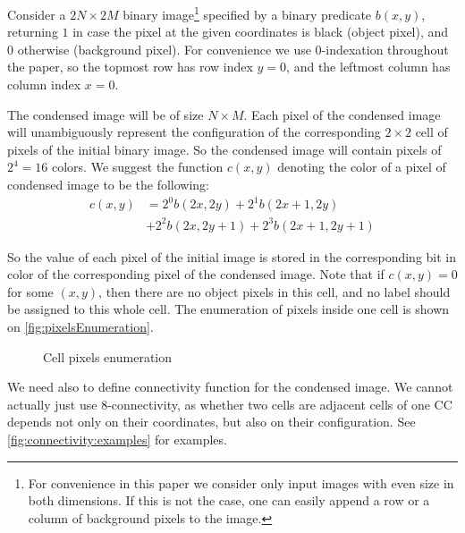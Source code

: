 \documentclass{llncs}
\begin{document}
Consider a $2N \times 2M$ binary image\footnote{
For convenience in this paper we consider only input images with even size
in both dimensions. If this is not the case, one can easily append a row or
a column of background pixels to the image.}
specified by a binary predicate $b(x, y)$,
returning $1$ in case the pixel at the given coordinates is black (object pixel),
and $0$ otherwise (background pixel).
For convenience we use 0-indexation throughout the paper, so the topmost row has
row index $y=0$, and the leftmost column has column index $x=0$.

The condensed image will be of size $N \times M$.
Each pixel of the condensed image will unambiguously represent the configuration
of the corresponding $2\times 2$ cell of pixels of the initial binary image.
So the condensed image will contain pixels of $2^4 = 16$ colors.
We suggest the function $c(x, y)$ denoting the color of a pixel of condensed image
to be the following:
\begin{align*}
  c(x, y) &= 2^0 b(2x, 2y)   + 2^1 b(2x+1, 2y) \\
          &+ {} 2^2 b(2x, 2y+1) + 2^3 b(2x+1,2y+1)
\end{align*}

So the value of each pixel of the initial image is stored in the corresponding
bit in color of the corresponding pixel of the condensed image.
Note that if $c(x, y) = 0$ for some $(x, y)$, then there are no object pixels in
this cell, and no label should be assigned to this whole cell. The enumeration of
pixels inside one cell is shown on \autoref{fig:pixelsEnumeration}.

\begin{figure}[t]
  \centering
  \caption{Cell pixels enumeration}
  \label{fig:pixelsEnumeration}
\end{figure}

We need also to define connectivity function for the condensed image.
We cannot actually just use 8-connectivity, as whether two cells are adjacent
cells of one CC depends not only on their coordinates, but also on their
configuration. See \autoref{fig:connectivity:examples} for examples.
\end{document}
